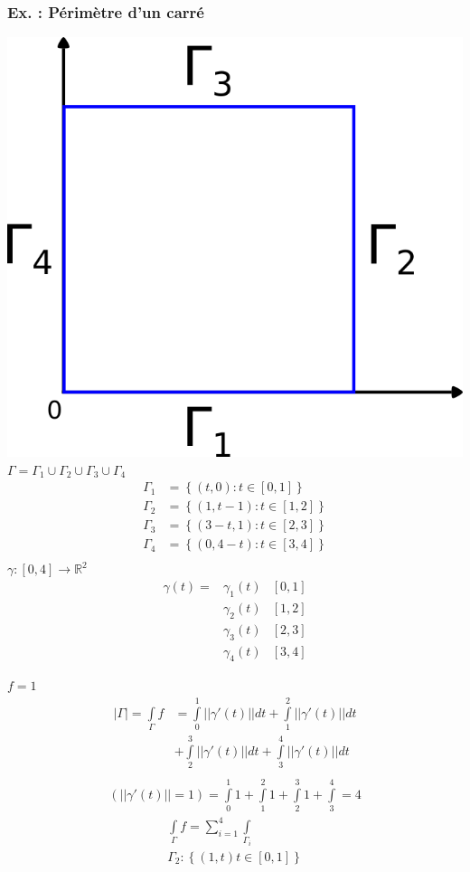 \documentclass[11pt]{article}
\begin{document}
\subsubsection{Ex. : Périmètre d'un carré}
\label{sec:orgheadline25}
\includegraphics[width=.9\linewidth]{images/an_ch2_ex_6.png}
\(\Gamma = \Gamma_1 \cup \Gamma_2 \cup \Gamma_3 \cup \Gamma_4\)
\begin{align*}
\Gamma_1 &= \left\lbrace (t,0): t\in \left[0,1\right] \right\rbrace\\
\Gamma_2 &= \left\lbrace (1,t-1): t\in \left[1,2\right] \right\rbrace\\
\Gamma_3 &= \left\lbrace (3-t,1): t\in \left[2,3\right] \right\rbrace\\
\Gamma_4 &= \left\lbrace (0,4-t): t\in \left[3,4\right] \right\rbrace\\
\end{align*}
\(\gamma: \left[0,4\right] \rightarrow \mathbb{R}^2\)
\begin{align*}
\gamma(t) = &\gamma_1(t) &\left[0,1\right]\\
 & \gamma_2(t) &\left[1,2\right]\\
 & \gamma_3(t) &\left[2,3\right]\\
 & \gamma_4(t) &\left[3,4\right]
\end{align*}


\(f=1\)
\begin{align*}
|\Gamma| = \int\limits_{\Gamma} f &= \int\limits_{0}^{1} || \gamma'(t)|| dt + \int\limits_{1}^{2} || \gamma'(t)|| dt\\
&+ \int\limits_{2}^{3} || \gamma'(t)|| dt  + \int\limits_{3}^{4} || \gamma'(t)|| dt\\
\end{align*}
\begin{align*}
(||\gamma'(t)||=1) = \int\limits_{0}^{1} 1 + \int\limits_{1}^{2} 1 + \int\limits_{2}^{3} 1 + \int\limits_{3}^{4} = 4
\end{align*}
\begin{align*}
\int\limits_{\Gamma}f= \sum\limits_{i=1}^4 \int\limits_{\Gamma_i}\\
\Gamma_2 : \left\lbrace (1,t) t \in \left[0,1\right] \right\rbrace
\end{align*}
\end{document}
